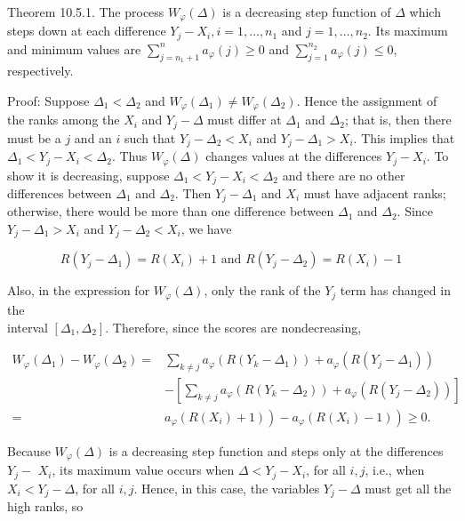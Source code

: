 Theorem 10.5.1. The process $W_{\varphi}(\Delta)$ is a decreasing step function of $\Delta$ which steps down at each difference $Y_{j}-X_{i}, i=1, \ldots, n_{1}$ and $j=1, \ldots, n_{2}$. Its maximum and minimum values are $\sum_{j=n_{1}+1}^{n} a_{\varphi}(j) \geq 0$ and $\sum_{j=1}^{n_{2}} a_{\varphi}(j) \leq 0$, respectively.

Proof: Suppose $\Delta_{1}<\Delta_{2}$ and $W_{\varphi}\left(\Delta_{1}\right) \neq W_{\varphi}\left(\Delta_{2}\right)$. Hence the assignment of the ranks among the $X_{i}$ and $Y_{j}-\Delta$ must differ at $\Delta_{1}$ and $\Delta_{2}$; that is, then there must be a $j$ and an $i$ such that $Y_{j}-\Delta_{2}<X_{i}$ and $Y_{j}-\Delta_{1}>X_{i}$. This implies that $\Delta_{1}<Y_{j}-X_{i}<\Delta_{2}$. Thus $W_{\varphi}(\Delta)$ changes values at the differences $Y_{j}-X_{i}$. To show it is decreasing, suppose $\Delta_{1}<Y_{j}-X_{i}<\Delta_{2}$ and there are no other differences between $\Delta_{1}$ and $\Delta_{2}$. Then $Y_{j}-\Delta_{1}$ and $X_{i}$ must have adjacent ranks; otherwise, there would be more than one difference between $\Delta_{1}$ and $\Delta_{2}$. Since $Y_{j}-\Delta_{1}>X_{i}$ and $Y_{j}-\Delta_{2}<X_{i}$, we have

$$
R\left(Y_{j}-\Delta_{1}\right)=R\left(X_{i}\right)+1 \text { and } R\left(Y_{j}-\Delta_{2}\right)=R\left(X_{i}\right)-1
$$

Also, in the expression for $W_{\varphi}(\Delta)$, only the rank of the $Y_{j}$ term has changed in the\\
interval $\left[\Delta_{1}, \Delta_{2}\right]$. Therefore, since the scores are nondecreasing,

$$
\begin{aligned}
W_{\varphi}\left(\Delta_{1}\right)-W_{\varphi}\left(\Delta_{2}\right)= & \sum_{k \neq j} a_{\varphi}\left(R\left(Y_{k}-\Delta_{1}\right)\right)+a_{\varphi}\left(R\left(Y_{j}-\Delta_{1}\right)\right) \\
& -\left[\sum_{k \neq j} a_{\varphi}\left(R\left(Y_{k}-\Delta_{2}\right)\right)+a_{\varphi}\left(R\left(Y_{j}-\Delta_{2}\right)\right)\right] \\
= & \left.\left.a_{\varphi}\left(R\left(X_{i}\right)+1\right)\right)-a_{\varphi}\left(R\left(X_{i}\right)-1\right)\right) \geq 0 .
\end{aligned}
$$

Because $W_{\varphi}(\Delta)$ is a decreasing step function and steps only at the differences $Y_{j}-$ $X_{i}$, its maximum value occurs when $\Delta<Y_{j}-X_{i}$, for all $i, j$, i.e., when $X_{i}<Y_{j}-\Delta$, for all $i, j$. Hence, in this case, the variables $Y_{j}-\Delta$ must get all the high ranks, so

